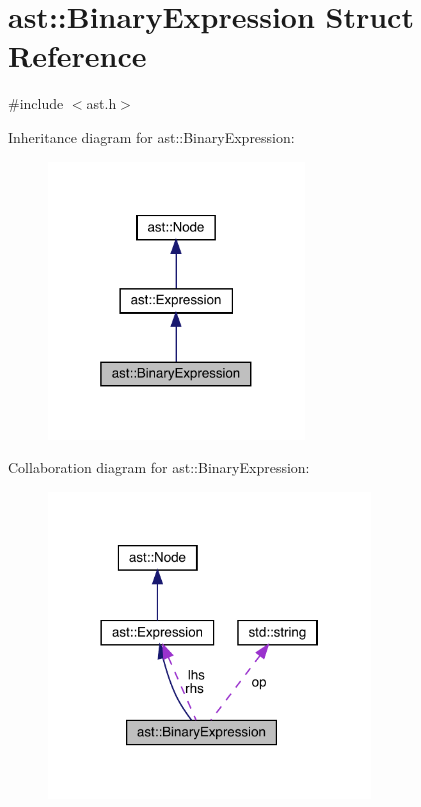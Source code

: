 \hypertarget{structast_1_1_binary_expression}{}\section{ast\+:\+:Binary\+Expression Struct Reference}
\label{structast_1_1_binary_expression}


{\ttfamily \#include $<$ast.\+h$>$}



Inheritance diagram for ast\+:\+:Binary\+Expression\+:\nopagebreak
\begin{figure}[H]
\begin{center}
\leavevmode
\includegraphics[width=193pt]{structast_1_1_binary_expression__inherit__graph}
\end{center}
\end{figure}


Collaboration diagram for ast\+:\+:Binary\+Expression\+:\nopagebreak
\begin{figure}[H]
\begin{center}
\leavevmode
\includegraphics[width=242pt]{structast_1_1_binary_expression__coll__graph}
\end{center}
\end{figure}
